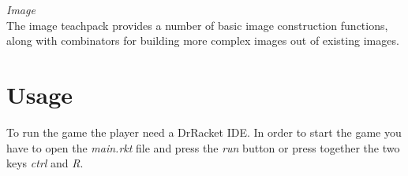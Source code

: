 \documentclass{article}
\begin{document}
 \textit{Image}\\
The image teachpack provides a number of basic image construction functions, along with combinators for building more complex images out of existing images.

 \section{Usage}
To run the game the player need a DrRacket IDE. In order to start the game you have to open the \textit{main.rkt} file and press the \textit{run} button or press together the two keys \textit{ctrl} and \textit{R}.

\end{document}
